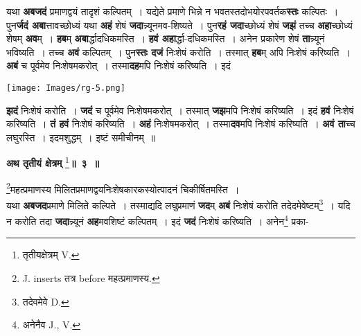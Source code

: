\documentclass[11pt, openany]{book}
\begin{document}
\newpage


\begin{flushleft}
\begin{minipage}[b]{0.65\textwidth}
\hspace{4mm}  यथा \textbf{अबजदं} प्रमाणद्वयं तादृशं कल्पितम्~। यद्येते प्रमाणे भिन्ने न भवतस्तदोभयोरपवर्तक\textbf{स्तः} कल्पितः~। पुन\textbf{र्जदं अबा}त्तावच्छोध्यं यथा \textbf{अहं} शेषं \textbf{जदा}न्न्यूनमव-शिष्यते~। पुन\textbf{रहं जदा}च्छोध्यं शेषं \textbf{जझं} तच्च \textbf{अहा}च्छोध्यं शेषम्  \textbf{अव}म्~।  \textbf{हब}म् \textbf{अबा}र्द्धादधिकमस्ति~। \textbf{हवं अहा}र्द्धा-दधिकमस्ति~। अनेन प्रकारेण शेषं \textbf{ता}न्न्यूनं भविष्यति~। तच्च \textbf{अवं} कल्पितम्~। पुन\textbf{स्तः दजं} निःशेषं करोति~। तस्मात् \textbf{हब}म् अपि निःशेषं करिष्यति~। \textbf{अबं} च पूर्वमेव निःशेषमकरोत्~। तस्मा\textbf{दह}मपि निःशेषं करिष्यति~। इदं
\end{minipage} 
\hfill
\begin{minipage}[b]{0.27\textwidth}
\texttt{[image: Images/rg-5.png]}
\end{minipage}
\end{flushleft}
\vspace{-3mm}

\noindent \textbf{झदं} निःशेषं करोति~। \textbf{जदं} च पूर्वमेव निःशेषमकरोत्~। तस्मात् \textbf{जझ}मपि निःशेषं करिष्यति~। इदं \textbf{हवं}  निःशेषं करिष्यति~। \textbf{तं हवं} निःशेषं करिष्यति~। \textbf{अहं} निःशेषमकरोत्~। तस्मा\textbf{दव}मपि निःशेषं करिष्यति~। \textbf{अवं ता}च्च लघुरस्ति~। इदमशुद्धम्~। इष्टं समीचीनम्~॥ 
\vspace{2mm}

\begin{center}
\textbf{\large अथ तृतीयं क्षेत्रम्}\renewcommand{\thefootnote}{१} \footnote{तृतीयक्षेत्रम् {\en V.}}\;\textbf{\large ॥~३~॥}
\end{center}

 {\ab \renewcommand{\thefootnote}{२}\footnote{{\en J. inserts} तत्र {\en before} महत्प्रमाणस्य.}महत्प्रमाणस्य मिलितप्रमाणद्वयनिःशेषकारकस्योत्पादनं 
चिकीर्षितमस्ति~। }\\

 यथा \textbf{अबजद}प्रमाणे मिलिते कल्पिते~। तस्माद्यदि लघुप्रमाणं \textbf{जद}म् \textbf{अबं} निःशेषं करोति तदेदमेवेष्टम्\renewcommand{\thefootnote}{३}\footnote{तदेवमेवे {\en D.}}~। यदि न करोति तदा \textbf{जदा}न्न्यूनं \textbf{अह}मवशिष्टं कल्पितम्~। इदं \textbf{जदं} निःशेषं करिष्यति~। अनेन\renewcommand{\thefootnote}{४}\footnote{अनेनैव {\en J., V.}} प्रका- 
\end{document}
